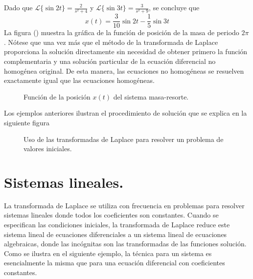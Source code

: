 Dado que $\mathscr{L} \{\sin 2t \} = \frac{2}{s^{2} + 4}$ y $\mathscr{L} \{\sin 3t \} = \frac{3}{s^{2} + 9}$, se concluye que
\[ x(t) = \dfrac{3}{10} \sin 2t - \dfrac{1}{5} \sin 3t \]
La figura () muestra la gráfica de la función de posición de la masa de periodo $2 \pi$. Nótese que una vez más que el método de la transformada de Laplace proporciona la solución directamente sin necesidad de obtener primero la función complementaria y una solución particular de la ecuación diferencial no homogénea original. De esta manera, las ecuaciones no homogéneas se resuelven exactamente igual que las ecuaciones homogéneas.
\begin{figure}[!h]
\centering

\label{fig:figura_003}
\caption{Función de la posición $x(t)$ del sistema masa-resorte.}
\end{figure}
Los ejemplos anteriores ilustran el procedimiento de solución que se explica en la siguiente figura
\begin{figure}[H]
\centering

\label{fig:figura_004}
\caption{Uso de las transformadas de Laplace para resolver un problema de valores iniciales.}
\end{figure}
\section{Sistemas lineales.}
La transformada de Laplace se utiliza con frecuencia en problemas para resolver sistemas lineales donde todos los coeficientes son constantes. Cuando se especifican las condiciones iniciales, la transformada de Laplace reduce este sistema lineal de ecuaciones diferenciales a un sistema lineal de ecuaciones algebraicas, donde las incógnitas son las transformadas de las funciones solución. Como se ilustra en el siguiente ejemplo, la técnica para un sistema es esencialmente la misma que para una ecuación diferencial con coeficientes constantes.
